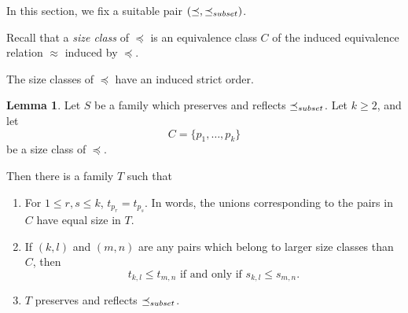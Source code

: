 \documentclass[12pt]{article}
\theoremstyle{definition}
\newtheorem{lemma}[theorem]{Lemma}
\newcommand{\set}[1]{\{ #1 \}}
\newcommand{\precsubseteq}{\preceq_{\scriptsize subset}}
\begin{document}
In this section, we fix a suitable pair 
$(\preceq, \precsubseteq)$.

Recall that a \emph{size class} of $\preceq$ is an equivalence class $C$
of the induced equivalence relation $\approx$ induced by $\preceq$.

The size classes of $\preceq$ have an induced strict order.

\begin{lemma}
Let $S$ be a family which preserves and reflects $\precsubseteq$.  Let $k\geq 2$, and let 
\[ C = \set{p_1, \ldots, p_k} \]
be a size class of  $\preceq$.
 
Then there is a family $T$ such that 
\begin{enumerate}
    \item 
 For $1\leq r,s \leq k$, $t_{p_r} = t_{p_s}$.
 In words, the  unions corresponding to the pairs in $C$ have equal size in $T$.   
    \item If $(k,l)$ and $(m,n)$ are any pairs 
    which belong to larger size classes than $C$,
    then 
    \[ \mbox{$t_{k,l} \leq t_{m,n} $ if and only if $s_{k,l} \leq s_{m,n} $}.\]
    \item $T$ preserves and reflects $\precsubseteq$. 
\label{equalize2}
\end{enumerate}
\label{lemma-equalize-subset}
\end{lemma}
\end{document}
